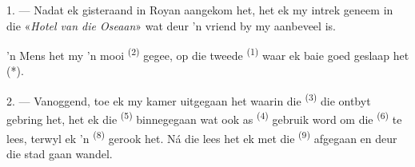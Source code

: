 %
%
%


\VUsaut{3.0mm}
\VUsaut{1.6mm}
\VUsaut{2.0mm}
\VUsaut{3.4mm}

1. --- Nadat ek gisteraand in Royan aangekom het, het ek my intrek geneem in die
«\textit{Hotel van die Oseaan}» wat deur 'n vriend by my aanbeveel is.

'n Mens het my 'n mooi  \textsuperscript{(2)} gegee, op die tweede
 \textsuperscript{(1)} waar ek baie goed geslaap het (*).

2. --- Vanoggend, toe ek my kamer uitgegaan het waarin die 
\textsuperscript{(3)} die ontbyt gebring het, het ek die 
\textsuperscript{(5)} binnegegaan wat ook as  \textsuperscript{(4)}
gebruik word om die  \textsuperscript{(6)} te lees, terwyl ek 'n
 \textsuperscript{(8)} gerook het. Ná die lees het ek met die
 \textsuperscript{(9)} afgegaan en deur die stad gaan wandel.

